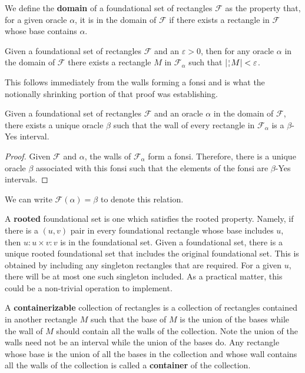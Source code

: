 \documentclass[12pt]{article}
\begin{document}
We define the \textbf{domain} of a foundational set of rectangles $\mathcal{F}$ as the property that, for a given oracle $\alpha$, it is in the domain of $\mathcal{F}$ if there exists a rectangle in $\mathcal{F}$ whose base contains $\alpha$.

\begin{corollary}\label{cor:fshrink}
Given a foundational set of rectangles $\mathcal{F}$ and an $\varepsilon > 0$, then for any oracle $\alpha$ in the domain of $\mathcal{F}$ there exists a rectangle $M$ in $\mathcal{F}_{\alpha}$ such that $|\wall{M}| < \varepsilon$.
\end{corollary}

This follows immediately from the walls forming a fonsi and is what the notionally shrinking portion of that proof was establishing. 

\begin{proposition}\label{pr:classfun}
Given a foundational set of rectangles $\mathcal{F}$ and an oracle $\alpha$ in the domain of $\mathcal{F}$, there exists a unique oracle $\beta$ such that the wall of every rectangle in $\mathcal{F}_{\alpha}$ is a $\beta$-Yes interval.
\end{proposition}

\begin{proof}
    Given $\mathcal{F}$ and $\alpha$, the walls of $\mathcal{F}_{\alpha}$ form a fonsi. Therefore, there is a unique oracle $\beta$ associated with this fonsi such that the elements of the fonsi are $\beta$-Yes intervals.
\end{proof}

We can write $\mathcal{F}(\alpha) = \beta$ to denote this relation. 

A \textbf{rooted} foundational set is one which satisfies the rooted property. Namely, if there is a $(u,v)$ pair in every foundational rectangle whose base includes $u$, then $u:u \times v:v$ is in the foundational set. Given a foundational set, there is a unique rooted foundational set that includes the original foundational set. This is obtained by including any singleton rectangles that are required. For a given $u$, there will be at most one such singleton included. As a practical matter, this could be a non-trivial operation to implement. 

A \textbf{containerizable} collection of rectangles is a collection of rectangles contained in another rectangle $M$ such that the base of $M$ is the union of the bases while the wall of $M$ should contain all the walls of the collection. Note the union of the walls need not be an interval while the union of the bases do. Any rectangle whose base is the union of all the bases in the collection and whose wall contains all the walls of the collection is called a \textbf{container} of the collection.
\end{document}
